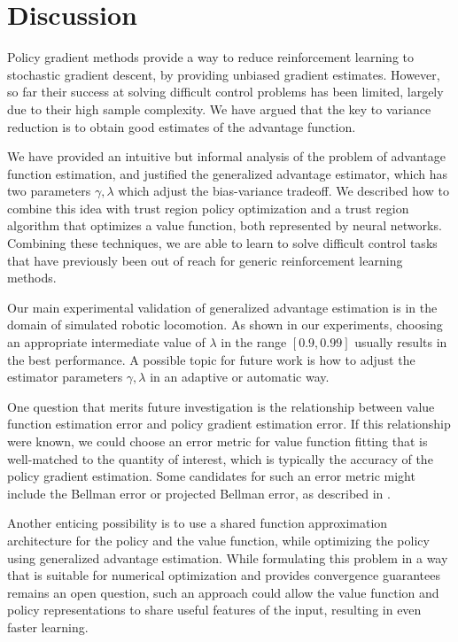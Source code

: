 \section{Discussion}

Policy gradient methods provide a way to reduce reinforcement learning to stochastic gradient descent, by providing unbiased gradient estimates. However, so far their success at solving difficult control problems has been limited, largely due to their high sample complexity. We have argued that the key to variance reduction is to obtain good estimates of the advantage function.

We have provided an intuitive but informal analysis of the problem of advantage function estimation, and justified the generalized advantage estimator, which has two parameters $\gamma,\lambda$ which adjust the bias-variance tradeoff. We described how to combine this idea with trust region policy optimization and a trust region algorithm that optimizes a value function, both represented by neural networks. Combining these techniques, we are able to learn to solve difficult control tasks that have previously been out of reach for generic reinforcement learning methods.

Our main experimental validation of generalized advantage estimation is in the domain of simulated robotic locomotion. As shown in our experiments, choosing an appropriate intermediate value of $\lambda$ in the range $[0.9, 0.99]$ usually results in the best performance. A possible topic for future work is how to adjust the estimator parameters $\gamma,\lambda$ in an adaptive or automatic way.

One question that merits future investigation is the relationship between value function estimation error and policy gradient estimation error. If this relationship were known, we could choose an error metric for value function fitting that is well-matched to the quantity of interest, which is typically the accuracy of the policy gradient estimation. Some candidates for such an error metric might include the Bellman error or projected Bellman error, as described in \cite{bhatnagar2009convergent}.

Another enticing possibility is to use a shared function approximation architecture for the policy and the value function, while optimizing the policy using generalized advantage estimation. While formulating this problem in a way that is suitable for numerical optimization and provides convergence guarantees remains an open question, such an approach could allow the value function and policy representations to share useful features of the input, resulting in even faster learning.

